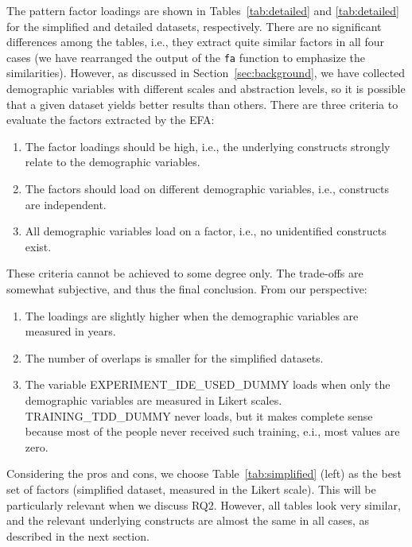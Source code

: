 \documentclass[10pt,conference]{IEEEtran}\usepackage[]{graphicx}\usepackage[table,xcdraw]{xcolor}
\begin{document}
The pattern factor loadings are shown in Tables~\ref{tab:detailed} and \ref{tab:detailed} for the simplified and detailed datasets, respectively. There are no significant differences among the tables, i.e., they extract quite similar factors in all four cases (we have rearranged the output of the \lstinline{fa} function to emphasize the similarities). However, as discussed in Section~\ref{sec:background}, we have collected demographic variables with different scales and abstraction levels, so it is possible that a given dataset yields better results than others. There are three criteria to evaluate the factors extracted by the EFA:
\begin{enumerate}
    \item The factor loadings should be high, i.e., the underlying constructs strongly relate to the demographic variables. 
    
    \item The factors should load on different demographic variables, i.e., constructs are independent.
    
    \item All demographic variables load on a factor, i.e., no unidentified constructs exist.
\end{enumerate}

These criteria cannot be achieved to some degree only. The trade-offs are somewhat subjective, and thus the final conclusion. From our perspective:
\begin{enumerate}
    \item The loadings are slightly higher when the demographic variables are measured in years.

    \item The number of overlaps is smaller for the simplified datasets. 

    \item The variable EXPERIMENT\_IDE\_USED\_DUMMY loads when only the demographic variables are measured in Likert scales. TRAINING\_TDD\_DUMMY never loads, but it makes complete sense because most of the people never received such training, e.i., most values are zero.
\end{enumerate}

Considering the pros and cons, we choose Table~\ref{tab:simplified} (left) as the best set of factors (simplified dataset, measured in the Likert scale). This will be particularly relevant when we discuss RQ2. However, all tables look very similar, and the relevant underlying constructs are almost the same in all cases, as described in the next section.
\end{document}
